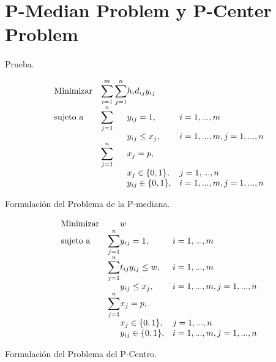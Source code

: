 \documentclass[spanish]{article}
\begin{document}
			\paragraph{}



	\section{P-Median Problem y P-Center Problem}
	\label{sec:5}

		\paragraph{}
		Prueba.

		\begin{eqfloat}
			\begin{equation}
				\begin{array}{ll@{}ll}
					\text{Minimizar}
						& \displaystyle\sum\limits_{i = 1}^m
							\displaystyle\sum\limits_{j = 1}^n	& h_i d_{ij} y_{ij}	&							\\
					\text{sujeto a}
						& \displaystyle\sum\limits_{j = 1}^n 	& y_{ij} = 1,		& i = 1,..., m	\\
						& 																	 	& y_{ij} \leq x_{j},  		& i=1 ,..., m,j=1 ,..., n  \\
						& \displaystyle\sum\limits_{j = 1}^n 	& x_{j} = p,  		& 						\\
						&                                     &	x_{j} \in \{0,1\},&j=1 ,..., n 	\\
						&                                     &	y_{ij} \in \{0,1\},&i=1 ,..., m, j=1 ,..., n  \\
				\end{array}
			\end{equation}
			\caption{Formulación del Problema de la P-mediana.}
      \label{eq:p_median}
    \end{eqfloat}

		\begin{eqfloat}
			\begin{equation}
				\begin{array}{ll@{}ll}
					\text{Minimizar}
						& 																 		& w	&							\\
					\text{sujeto a}
						& \displaystyle\sum\limits_{j = 1}^n 	& y_{ij} = 1,		&i=1 ,..., m	\\
						& \displaystyle\sum\limits_{j = 1}^n 	& t_{ij}y_{ij} \leq w,  		& i=1 ,..., m \\
						& 																	 	& y_{ij} \leq x_{j},  		& i=1 ,..., m,j=1 ,..., n  \\
						& \displaystyle\sum\limits_{j = 1}^n 	& x_{j} = p,  		& 						\\
						&                                     &	x_{j} \in \{0,1\},&j=1 ,..., n 	\\
						&                                     &	y_{ij} \in \{0,1\},&i=1 ,..., m, j=1 ,..., n  \\
				\end{array}
			\end{equation}
			\caption{Formulación del Problema del P-Centro.}
      \label{eq:p_center}
    \end{eqfloat}
\end{document}
